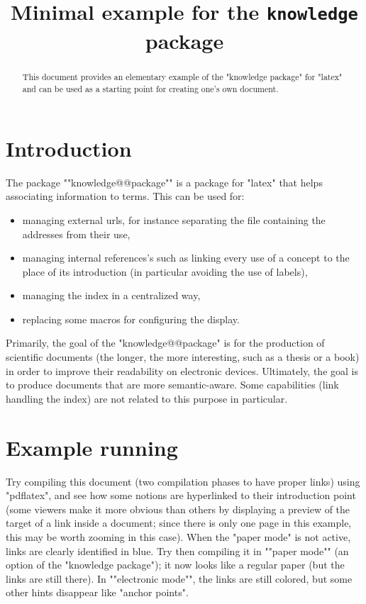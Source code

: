 \documentclass{article}
\title{Minimal example for the \texttt{knowledge} package}
\date{}
\begin{document}
\maketitle
\begin{abstract}
\AP This document provides an elementary example of the "knowledge package" for "latex" and can be used as a starting point for creating one's own document.
\end{abstract}

\section{Introduction}
\label{section:introduction}

The package ""knowledge@@package"" is a package for "latex" that helps associating information to terms. This can be used for:
\begin{itemize}
\item managing external urls, for instance separating the file containing  the addresses from their use,
\item managing internal references's such as linking every use of a concept to the place of its introduction (in particular avoiding the use of labels),
\item managing the index in a centralized way,
\item replacing some macros for configuring the display.
\end{itemize}
Primarily, the goal of the "knowledge@@package" is for the production of scientific documents (the longer, the more interesting, such as a thesis or a book) in order to improve their readability on electronic devices. Ultimately, the goal is to produce documents that are more semantic-aware. Some capabilities (link handling the index) are not related to this purpose in particular.

\section{Example running}
\label{section:example}
Try compiling this document (two compilation phases to have proper links) using "pdflatex", and see how some notions are hyperlinked to their introduction point (some viewers make it more obvious than others by displaying a preview of the target of a link inside a document; since there is only one page in this example, this may be worth zooming in this case).
\AP When the "paper mode" is not active, links are clearly identified in blue. Try then compiling it in ""paper mode"" (an option of the "knowledge package"); it now looks like a regular paper (but the links are still there). In ""electronic mode"",
the links are still colored, but some other hints disappear like "anchor points".
\end{document}
